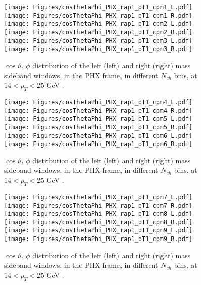 \documentclass[12pt]{article}
\begin{document}

\begin{figure}[htbp]
\centering
\texttt{[image: Figures/cosThetaPhi\_PHX\_rap1\_pT1\_cpm1\_L.pdf]}
\texttt{[image: Figures/cosThetaPhi\_PHX\_rap1\_pT1\_cpm1\_R.pdf]}
\texttt{[image: Figures/cosThetaPhi\_PHX\_rap1\_pT1\_cpm2\_L.pdf]}
\texttt{[image: Figures/cosThetaPhi\_PHX\_rap1\_pT1\_cpm2\_R.pdf]}
\texttt{[image: Figures/cosThetaPhi\_PHX\_rap1\_pT1\_cpm3\_L.pdf]}
\texttt{[image: Figures/cosThetaPhi\_PHX\_rap1\_pT1\_cpm3\_R.pdf]}
\caption{$\cos\vartheta,\,\phi$ distribution of the left (left) and
  right (right) mass sideband windows, in the PHX frame, in different
  $N_{ch}$ bins, at $14 < p_{T} < 25$ GeV .}
\end{figure}
\clearpage

\begin{figure}[htbp]
\centering
\texttt{[image: Figures/cosThetaPhi\_PHX\_rap1\_pT1\_cpm4\_L.pdf]}
\texttt{[image: Figures/cosThetaPhi\_PHX\_rap1\_pT1\_cpm4\_R.pdf]}
\texttt{[image: Figures/cosThetaPhi\_PHX\_rap1\_pT1\_cpm5\_L.pdf]}
\texttt{[image: Figures/cosThetaPhi\_PHX\_rap1\_pT1\_cpm5\_R.pdf]}
\texttt{[image: Figures/cosThetaPhi\_PHX\_rap1\_pT1\_cpm6\_L.pdf]}
\texttt{[image: Figures/cosThetaPhi\_PHX\_rap1\_pT1\_cpm6\_R.pdf]}
\caption{$\cos\vartheta,\,\phi$ distribution of the left (left) and
  right (right) mass sideband windows, in the PHX frame, in different
  $N_{ch}$ bins, at $14 < p_{T} < 25$ GeV .}
\end{figure}
\clearpage

\begin{figure}[htbp]
\centering
\texttt{[image: Figures/cosThetaPhi\_PHX\_rap1\_pT1\_cpm7\_L.pdf]}
\texttt{[image: Figures/cosThetaPhi\_PHX\_rap1\_pT1\_cpm7\_R.pdf]}
\texttt{[image: Figures/cosThetaPhi\_PHX\_rap1\_pT1\_cpm8\_L.pdf]}
\texttt{[image: Figures/cosThetaPhi\_PHX\_rap1\_pT1\_cpm8\_R.pdf]}
\texttt{[image: Figures/cosThetaPhi\_PHX\_rap1\_pT1\_cpm9\_L.pdf]}
\texttt{[image: Figures/cosThetaPhi\_PHX\_rap1\_pT1\_cpm9\_R.pdf]}
\caption{$\cos\vartheta,\,\phi$ distribution of the left (left) and
  right (right) mass sideband windows, in the PHX frame, in different
  $N_{ch}$ bins, at $14 < p_{T} < 25$ GeV .}
\end{figure}
\clearpage
\end{document}

